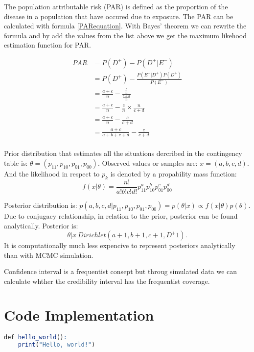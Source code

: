The population attributable risk (PAR) is defined as the proportion of the disease in a population that have occured due to exposure. The PAR can be calculated with formula \ref{PARequation}. With Bayes' theorem we can rewrite the formula and by add the values from the list above we get the maximum likehood estimation function for PAR.

\begin{equation}
\begin{split}
PAR &= P(D^+) - P(D^+| E^-) \\
    &= P(D^+) - \frac{P(E^-|D^+)P(D^+)}{P(E^-)} \\
    &= \frac{a + c}{n} - \frac{\frac{c}{n}}{\frac{c + d}{n}} \\
    &= \frac{a + c}{n} - \frac{c}{n} \times  \frac{n}{c + d} \\
    &= \frac{a + c}{n} - \frac{c}{c + d} \\
    &= \frac{a + c}{a + b + c + d} - \frac{c}{c + d} \\
\end{split}
\end{equation}

Prior distribution that estimates all the situations dercribed in the contingency table is: 
$\theta = (p_{11}, p_{10}, p_{01}, p_{00})$. Observed values or samples are: $x = (a, b, c, d)$. And the likelihood in respect to $p_k$ is denoted by a propability mass function: 
\begin{equation}
    f(x|\theta) = \frac{n!}{a!b!c!d!}p_{11}^ap_{10}^bp_{01}^cp_{00}^d
\end{equation}

Posterior distribution is: $p(a,b,c,d|p_{11}, p_{10},p_{01},p_{00}) = p(\theta|x) \varpropto  f (x|\theta)p(\theta)$. Due to conjugacy relationship, in relation to the prior, posterior can be found analytically. Posterior is:
\begin{equation}
    \theta|x ~ Dirichlet(a + 1, b + 1, c + 1, D^+ 1).
\end{equation}
It is computationally much less expencive to represent posteriors analytically than with MCMC simulation. \cite{Pirikahu2016BayesianMO}

Confidence interval is a frequentist consept but throug simulated data we can calculate whther the credibility interval has the frequentist coverage.

\section{Code Implementation} \label{CodeImplementation}
\begin{lstlisting}[language=R]
def hello_world():
    print("Hello, world!")
\end{lstlisting}